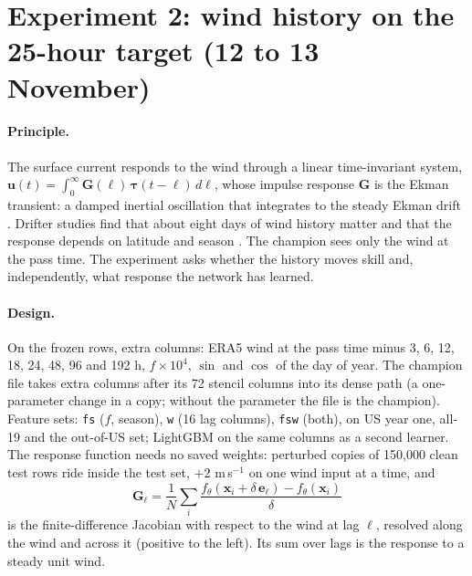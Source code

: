 \documentclass[11pt]{article}
\newcommand{\code}[1]{\texttt{#1}}
\begin{document}
\section{Experiment 2: wind history on the 25-hour target (12 to 13 November)}\label{sec:phase2}

\paragraph{Principle.} The surface current responds to the wind through a linear time-invariant system, $\mathbf{u}(t) = \int_0^\infty \mathbf{G}(\ell)\,\boldsymbol\tau(t - \ell)\,d\ell$, whose impulse response $\mathbf{G}$ is the Ekman transient: a damped inertial oscillation that integrates to the steady Ekman drift \citep{ekman1905,pollard1970slab,elipot2009ekman}. Drifter studies find that about eight days of wind history matter and that the response depends on latitude and season \citep{ubelmann2025wind,elipot2016hourly}. The champion sees only the wind at the pass time. The experiment asks whether the history moves skill and, independently, what response the network has learned.

\paragraph{Design.} On the frozen rows, extra columns: ERA5 wind at the pass time minus 3, 6, 12, 18, 24, 48, 96 and 192 h, $f\times10^4$, $\sin$ and $\cos$ of the day of year. The champion file takes extra columns after its 72 stencil columns into its dense path (a one-parameter change in a copy; without the parameter the file is the champion). Feature sets: \code{fs} ($f$, season), \code{w} (16 lag columns), \code{fsw} (both), on US year one, all-19 and the out-of-US set; LightGBM on the same columns as a second learner. The response function needs no saved weights: perturbed copies of 150,000 clean test rows ride inside the test set, $+2$ m\,s$^{-1}$ on one wind input at a time, and
\begin{equation}
\mathbf{G}_\ell = \frac{1}{N}\sum_i \frac{f_\theta(\mathbf{x}_i + \delta\,\mathbf{e}_\ell) - f_\theta(\mathbf{x}_i)}{\delta}
\label{eq:jacobian}
\end{equation}
is the finite-difference Jacobian with respect to the wind at lag $\ell$, resolved along the wind and across it (positive to the left). Its sum over lags is the response to a steady unit wind.
\end{document}

